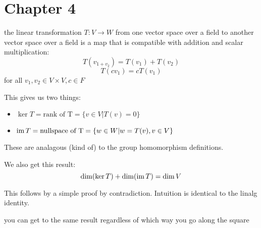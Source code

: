 \section{Chapter 4}

\begin{definition}
  the linear transformation $T:V \rightarrow W$ from one vector space over a
  field to another vector space over a field is a map that is compatible with addition and scalar multiplication:
  \[T(v_{1 + v_{2 }}) = T(v_{1}) + T(v_{2})\]
  \[T(cv_{1}) = cT(v_{1})\]
  for all $v_{1},v_{2} \in V\times V, c \in F$

  This gives us two things:
  \begin{itemize}
      \item $\ker T = \text{rank of T} = \{v \in V | T(v) = 0\}$
      \item $\operatorname{im} T = \text{nullspace of T} = \{w \in W | w = T(v), v \in V\}$
  \end{itemize}
  These are analagous (kind of) to the group homomorphism definitions.

  We also get this result:
  \[\dim (\ker T) + \dim (\operatorname{im} T) = \dim V\]

  This follows by a simple proof by contradiction. Intuition is identical to the
  linalg identity.

\end{definition}

\begin{definition}
  you can get to the same result regardless of which way you go along the square
\end{definition}
